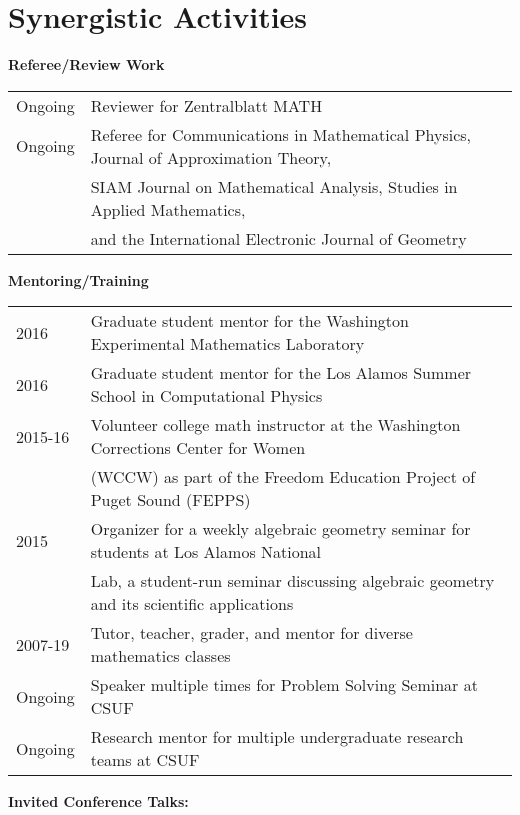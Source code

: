 \documentclass[11pt,letterpaper]{article}
\theoremstyle{definition}
\begin{document}
\section{Synergistic Activities}\mbox{}
\begin{center}
\textbf{Referee/Review Work}
\end{center}
\begin{tabular}{ll}
Ongoing & Reviewer for Zentralblatt MATH\\
Ongoing & Referee for Communications in Mathematical Physics, Journal of Approximation Theory,\\
        & SIAM Journal on Mathematical Analysis, Studies in Applied Mathematics,\\
	& and the International Electronic Journal of Geometry
\end{tabular}
\begin{center}
\textbf{Mentoring/Training}
\end{center}
\begin{tabular}{ll}
2016 & Graduate student mentor for the Washington Experimental Mathematics Laboratory\\
2016 & Graduate student mentor for the Los Alamos Summer School in Computational Physics\\
2015-16 & Volunteer college math instructor at the Washington Corrections Center for Women\\
 & (WCCW) as part of the Freedom Education Project of Puget Sound (FEPPS)\\
2015 & Organizer for a weekly algebraic geometry seminar for students at Los Alamos National\\
 & Lab, a student-run seminar discussing algebraic geometry and its scientific applications\\
2007-19 & Tutor, teacher, grader, and mentor for diverse mathematics classes\\
Ongoing & Speaker multiple times for Problem Solving Seminar at CSUF\\
Ongoing & Research mentor for multiple undergraduate research teams at CSUF
\end{tabular}
\begin{center}
\textbf{Invited Conference Talks:}
\end{center}
\end{document}
